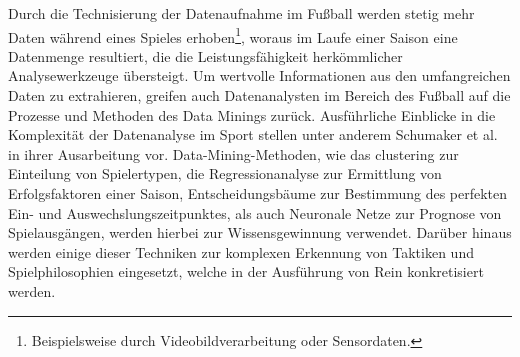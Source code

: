 Durch die Technisierung der Datenaufnahme im Fußball werden stetig mehr Daten während eines Spieles erhoben\footnote{Beispielsweise durch Videobildverarbeitung oder Sensordaten.}, woraus im Laufe einer Saison eine Datenmenge resultiert, die die Leistungsfähigkeit herkömmlicher Analysewerkzeuge übersteigt. Um wertvolle Informationen aus den umfangreichen Daten zu extrahieren, greifen auch Datenanalysten im Bereich des Fußball auf die Prozesse und Methoden des Data Minings zurück. Ausführliche Einblicke in die Komplexität der Datenanalyse im Sport stellen unter anderem Schumaker et al. in ihrer Ausarbeitung vor. Data-Mining-Methoden, wie das \gls{clustering} zur Einteilung von Spielertypen, die Regressionanalyse zur Ermittlung von Erfolgsfaktoren einer Saison, Entscheidungsbäume zur Bestimmung des perfekten Ein- und Auswechslungszeitpunktes, als auch Neuronale Netze zur Prognose von Spielausgängen, werden hierbei zur Wissensgewinnung verwendet. Darüber hinaus werden einige dieser Techniken zur komplexen Erkennung von Taktiken und Spielphilosophien eingesetzt, welche in der Ausführung von Rein konkretisiert werden.



